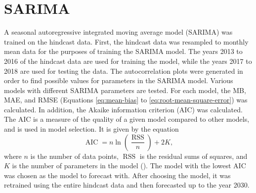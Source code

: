 \section{SARIMA}
	A seasonal autoregressive integrated moving average model (SARIMA) was trained on the hindcast data.
	First, the hindcast data was resampled to monthly mean data for the purposes of training the SARIMA model.
	The years 2013 to 2016 of the hindcast data are used for training the model, while the years 2017 to 2018 are used for testing the data.
	The autocorrelation plots were generated in order to find possible values for parameters in the SARIMA model.
	Various models with different SARIMA parameters are tested.
	For each model, the MB, MAE, and RMSE (Equations \ref{eq:mean-bias} to \ref{eq:root-mean-square-error}) was calculated.
	In addition, the Akaike information criterion (AIC) was calculated.
	The AIC is a measure of the quality of a given model compared to other models, and is used in model selection.
	It is given by the equation
	\begin{equation}
		\operatorname{AIC} = n \ln \left( 
			\frac{\operatorname{RSS}}{n} 
		\right) + 2K,
		\label{eq:akaike-information-criterion}
	\end{equation}
	where $n$ is the number of data points,
		$\operatorname{RSS}$ is the residual sums of squares,
		and
		$K$ is the number of parameters in the model
		(\cite{Chen2018}).
	The model with the lowest AIC was chosen as the model to forecast with.
	After choosing the model, it was retrained using the entire hindcast data and then forecasted up to the year 2030.